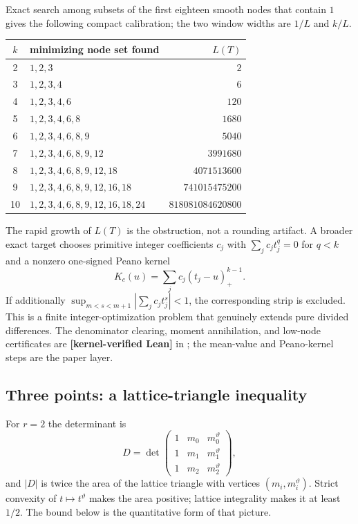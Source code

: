 \documentclass[11pt,oneside]{article}
\theoremstyle{definition}
\theoremstyle{remark}
\newcommand{\thetaq}{\vartheta}
\newcommand{\lean}[1]{\texttt{\detokenize{#1}}}
\newcommand{\statuslean}{\textcolor{leanblue}{\textbf{[kernel-verified Lean]}}}
\begin{document}
Exact search among subsets of the first eighteen smooth nodes that contain $1$ gives the
following compact calibration; the two window widths are $1/L$ and $k/L$.
\begin{center}
\small
\begin{tabular}{c l r}
\toprule
$k$ & minimizing node set found & $L(T)$\\
\midrule
2 & $1,2,3$ & $2$\\
3 & $1,2,3,4$ & $6$\\
4 & $1,2,3,4,6$ & $120$\\
5 & $1,2,3,4,6,8$ & $1680$\\
6 & $1,2,3,4,6,8,9$ & $5040$\\
7 & $1,2,3,4,6,8,9,12$ & $3991680$\\
8 & $1,2,3,4,6,8,9,12,18$ & $4071513600$\\
9 & $1,2,3,4,6,8,9,12,16,18$ & $741015475200$\\
10 & $1,2,3,4,6,8,9,12,16,18,24$ & $818081084620800$\\
\bottomrule
\end{tabular}
\end{center}
The rapid growth of $L(T)$ is the obstruction, not a rounding artifact.  A broader exact
target chooses primitive integer coefficients $c_j$ with
$\sum_jc_jt_j^q=0$ for $q<k$ and a nonzero one-signed Peano kernel
\[
 K_c(u)=\sum_jc_j(t_j-u)_+^{k-1}.
\]
If additionally $\sup_{m<s<m+1}|\sum_jc_jt_j^s|<1$, the corresponding strip is excluded.
This is a finite integer-optimization problem that genuinely extends pure divided
differences.  The denominator clearing, moment annihilation, and low-node certificates are
\statuslean{} in \lean{ClearedDividedDifference}; the mean-value and Peano-kernel steps are
the paper layer.

\subsection{Three points: a lattice-triangle inequality}

For $r=2$ the determinant is
\[
 D=\det\begin{pmatrix}
 1&m_0&m_0^{\thetaq}\\
 1&m_1&m_1^{\thetaq}\\
 1&m_2&m_2^{\thetaq}
 \end{pmatrix},
\]
and $|D|$ is twice the area of the lattice triangle with vertices $(m_i,m_i^{\thetaq})$.
Strict convexity of $t\mapsto t^{\thetaq}$ makes the area positive; lattice integrality makes
it at least $1/2$.  The bound below is the quantitative form of that picture.
\end{document}
